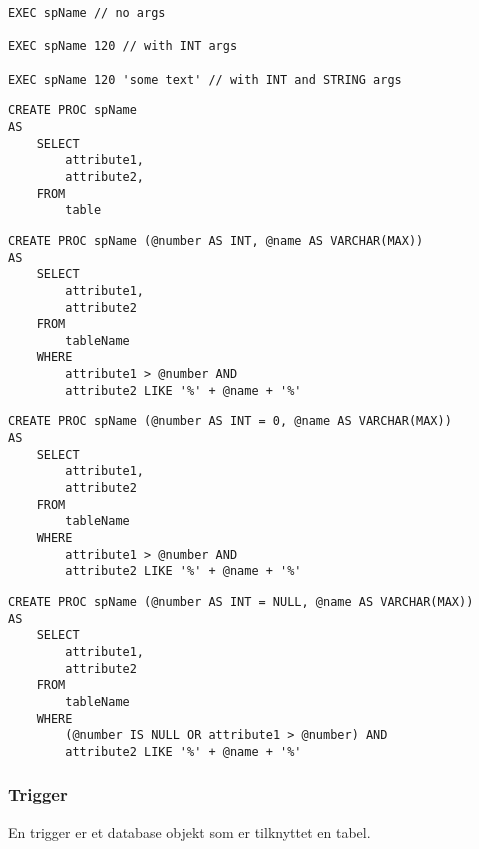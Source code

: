 \begin{lstlisting}[caption=Kald af Stored Procedure.]
EXEC spName // no args

EXEC spName 120 // with INT args

EXEC spName 120 'some text' // with INT and STRING args
\end{lstlisting}

\begin{lstlisting}[caption=Eksempel på Stored Procedure uden parametre.]
CREATE PROC spName
AS 
	SELECT
		attribute1, 
		attribute2,
	FROM
		table
\end{lstlisting}

\begin{lstlisting}[caption=Eksempel på Stored Procedure med parametre.]
CREATE PROC spName (@number AS INT, @name AS VARCHAR(MAX))
AS 
	SELECT
		attribute1,
		attribute2
	FROM
		tableName
	WHERE
		attribute1 > @number AND
		attribute2 LIKE '%' + @name + '%'
\end{lstlisting}

\begin{lstlisting}[caption=Eksempel på Stored Procedure med 'optionel' parametre.]
CREATE PROC spName (@number AS INT = 0, @name AS VARCHAR(MAX))
AS 
	SELECT
		attribute1,
		attribute2
	FROM
		tableName
	WHERE
		attribute1 > @number AND
		attribute2 LIKE '%' + @name + '%'
\end{lstlisting}

\begin{lstlisting}[caption=Eksempel på Stored Procedure med 'optionel' parametre ('Avanceret').]
CREATE PROC spName (@number AS INT = NULL, @name AS VARCHAR(MAX))
AS 
	SELECT
		attribute1,
		attribute2
	FROM
		tableName
	WHERE
		(@number IS NULL OR attribute1 > @number) AND
		attribute2 LIKE '%' + @name + '%'
\end{lstlisting}

\subsubsection{Trigger}
En trigger er et database objekt som er tilknyttet en tabel.


